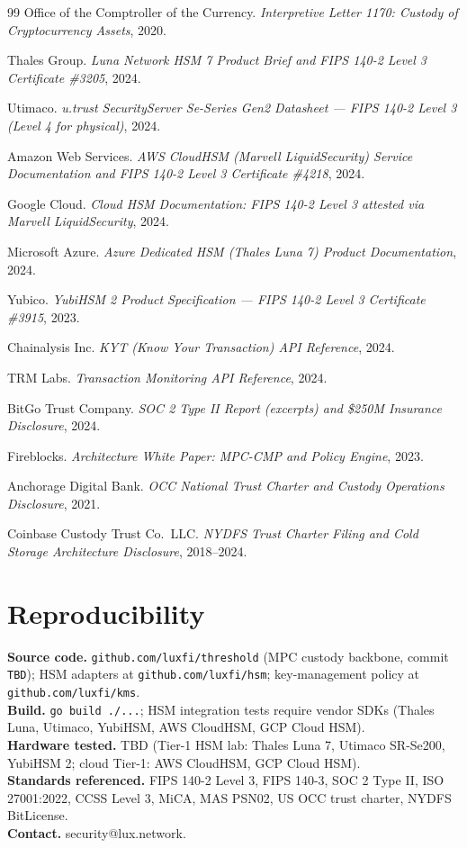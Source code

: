 \documentclass[11pt,a4paper]{article}
\begin{document}
\begin{thebibliography}{99}
Office of the Comptroller of the Currency. \emph{Interpretive
Letter 1170: Custody of Cryptocurrency Assets}, 2020.

Thales Group. \emph{Luna Network HSM 7 Product Brief and FIPS 140-2
Level 3 Certificate \#3205}, 2024.

Utimaco. \emph{u.trust SecurityServer Se-Series Gen2 Datasheet --- FIPS
140-2 Level 3 (Level 4 for physical)}, 2024.

Amazon Web Services. \emph{AWS CloudHSM (Marvell LiquidSecurity)
Service Documentation and FIPS 140-2 Level 3 Certificate \#4218},
2024.

Google Cloud. \emph{Cloud HSM Documentation: FIPS 140-2 Level 3
attested via Marvell LiquidSecurity}, 2024.

Microsoft Azure. \emph{Azure Dedicated HSM (Thales Luna 7) Product
Documentation}, 2024.

Yubico. \emph{YubiHSM 2 Product Specification --- FIPS 140-2 Level 3
Certificate \#3915}, 2023.

Chainalysis Inc. \emph{KYT (Know Your Transaction) API Reference},
2024.

TRM Labs. \emph{Transaction Monitoring API Reference}, 2024.

BitGo Trust Company. \emph{SOC 2 Type II Report (excerpts) and
\$250M Insurance Disclosure}, 2024.

Fireblocks. \emph{Architecture White Paper: MPC-CMP and Policy
Engine}, 2023.

Anchorage Digital Bank. \emph{OCC National Trust Charter and
Custody Operations Disclosure}, 2021.

Coinbase Custody Trust Co.~LLC. \emph{NYDFS Trust Charter Filing
and Cold Storage Architecture Disclosure}, 2018--2024.

\end{thebibliography}

\appendix
\section*{Reproducibility}
\textbf{Source code.} \texttt{github.com/luxfi/threshold} (MPC custody backbone, commit \texttt{TBD}); HSM adapters at \texttt{github.com/luxfi/hsm}; key-management policy at \texttt{github.com/luxfi/kms}.\\
\textbf{Build.} \texttt{go build ./...}; HSM integration tests require vendor SDKs (Thales Luna, Utimaco, YubiHSM, AWS CloudHSM, GCP Cloud HSM).\\
\textbf{Hardware tested.} TBD (Tier-1 HSM lab: Thales Luna 7, Utimaco SR-Se200, YubiHSM 2; cloud Tier-1: AWS CloudHSM, GCP Cloud HSM).\\
\textbf{Standards referenced.} FIPS 140-2 Level 3, FIPS 140-3, SOC 2 Type II, ISO 27001:2022, CCSS Level 3, MiCA, MAS PSN02, US OCC trust charter, NYDFS BitLicense.\\
\textbf{Contact.} security@lux.network.
\end{document}
